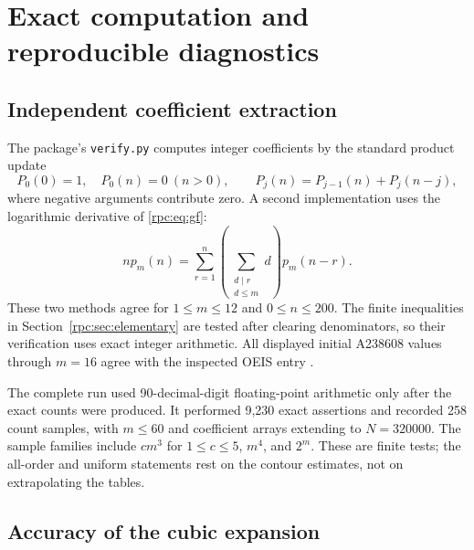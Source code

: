 \documentclass[11pt]{article}
\theoremstyle{definition}
\theoremstyle{remark}
\numberwithin{equation}{section}
\begin{document}
\section{Exact computation and reproducible diagnostics}\label{rpc:sec:checks}

\subsection{Independent coefficient extraction}

The package's \texttt{verify.py} computes integer coefficients by the
standard product update
\[
 P_0(0)=1,\quad P_0(n)=0\ (n>0),\qquad
 P_j(n)=P_{j-1}(n)+P_j(n-j),
\]
where negative arguments contribute zero. A second implementation uses the
logarithmic derivative of \eqref{rpc:eq:gf}:
\begin{equation}\label{rpc:eq:independentrec}
 n p_m(n)=\sum_{r=1}^n
  \left(\sum_{\substack{d\mid r\\d\le m}}d\right)p_m(n-r).
\end{equation}
These two methods agree for $1\le m\le12$ and $0\le n\le200$.
The finite inequalities in Section~\ref{rpc:sec:elementary} are tested after
clearing denominators, so their verification uses exact integer arithmetic.
All displayed initial A238608 values through $m=16$ agree with the inspected
OEIS entry \cite{oeis238608}.

The complete run used 90-decimal-digit floating-point arithmetic only after
the exact counts were produced. It performed 9,230 exact assertions and
recorded 258 count samples, with $m\le60$ and coefficient arrays extending
to $N=320000$. The sample families include $c m^3$ for $1\le c\le5$,
$m^4$, and $2^m$. These are finite tests; the all-order and uniform statements
rest on the contour estimates, not on extrapolating the tables.

\subsection{Accuracy of the cubic expansion}
\end{document}

